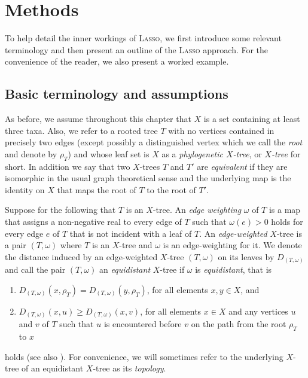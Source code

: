 \section{Methods}
\label{sec:methods}

To help detail the inner workings of \textsc{Lasso}, we first introduce some
relevant terminology and then present an outline of the \textsc{Lasso}
approach. For the convenience of the reader, we also present a worked example.

\subsection{Basic terminology and assumptions}
\label{sec:terminology}

As before, we assume throughout this chapter that $X$ is a set containing at
least three taxa. Also, we refer to a rooted tree $T$ with no vertices
contained in precisely two edges (except possibly a distinguished vertex which
we call the {\em root} and denote by $\rho_T$) and whose leaf set is $X$ as a
{\em phylogenetic $X$-tree}, or {\em $X$-tree} for short.  In addition we say
that two $X$-trees $T$ and $T'$ are {\em equivalent} if they are isomorphic in
the usual graph theoretical sense and the underlying map is the identity on
$X$ that maps the root of $T$ to the root of $T'$.

Suppose for the following that $T$ is an $X$-tree.  An {\em edge weighting}
$\omega$ of $T$ is a map that assigns a non-negative real to every edge of $T$
such that $\omega(e)>0$ holds for every edge $e$ of $T$ that is not incident
with a leaf of $T$.  An {\em edge-weighted} $X$-tree is a pair $(T,\omega)$
where $T$ is an $X$-tree and $\omega$ is an edge-weighting for it.  We denote
the distance induced by an edge-weighted $X$-tree $(T,\omega)$ on its leaves
by $D_{(T,\omega)}$ and call the pair $(T,\omega)$ an {\em equidistant}
$X$-tree if ${\omega}$ is {\em equidistant}, that is
\begin{enumerate}
\item $D_{(T,\omega)}(x,\rho_T)=  D_{(T,\omega)}(y,\rho_T)$, for all elements
$x,y\in X$, and
\item $D_{(T,\omega)}(x,u)\geq D_{(T,\omega)}(x,v)$, for all elements $x\in X$
  and any vertices $u$ and $v$ of $T$ such that $u$ is encountered before $v$
  on the path from the root $\rho_T$ to $x$
\end{enumerate} 
holds (see also \cite{semple2003phylogenetics}). For convenience, we will sometimes refer to the
underlying $X$-tree of an equidistant $X$-tree as its {\em topology}.

